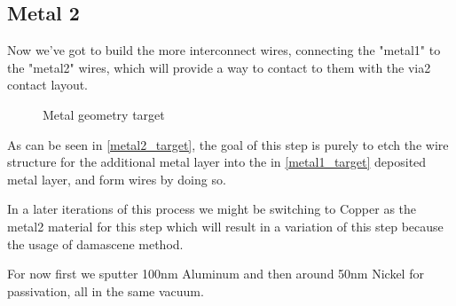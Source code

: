 \subsection{Metal 2}\label{chapter_metal2}

Now we've got to build the more interconnect wires, connecting the "metal1" to the "metal2" wires,
which will provide a way to contact to them with the via2 contact layout.

\begin{figure}[H]
	\centering
	\begin{tikzpicture}[node distance = 3cm, auto, thick,scale=\CrossAndTopSectionBig, every node/.style={transform shape}]
		
	\end{tikzpicture}
	\caption{Metal geometry target}
	\label{metal2_target}
\end{figure}

As can be seen in \autoref{metal2_target}, the goal of this step is purely to etch the wire structure for the additional
metal layer into the in \autoref{metal1_target} deposited metal layer, and form wires by doing so.

In a later iterations of this process we might be switching to Copper as the metal2 material for this step which
will result in a variation of this step because the usage of damascene method.

For now first we sputter 100nm Aluminum and then around 50nm Nickel for passivation, all in the same vacuum.
